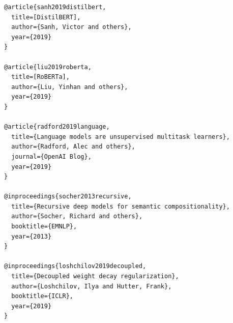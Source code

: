 \begin{lstlisting}
@article{sanh2019distilbert,
  title=[DistilBERT],
  author={Sanh, Victor and others},
  year={2019}
}

@article{liu2019roberta,
  title=[RoBERTa],
  author={Liu, Yinhan and others},
  year={2019}
}

@article{radford2019language,
  title={Language models are unsupervised multitask learners},
  author={Radford, Alec and others},
  journal={OpenAI Blog},
  year={2019}
}

@inproceedings{socher2013recursive,
  title={Recursive deep models for semantic compositionality},
  author={Socher, Richard and others},
  booktitle={EMNLP},
  year={2013}
}

@inproceedings{loshchilov2019decoupled,
  title={Decoupled weight decay regularization},
  author={Loshchilov, Ilya and Hutter, Frank},
  booktitle={ICLR},
  year={2019}
}
\end{lstlisting}


